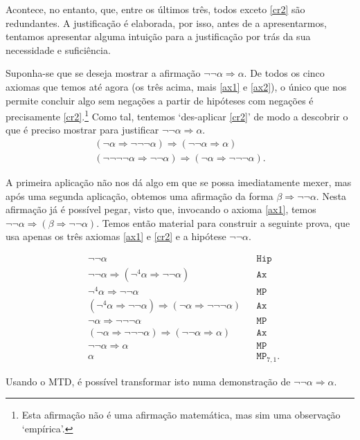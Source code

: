 \documentclass{report}
\theoremstyle{definition}
\theoremstyle{remark}
\newcommand{\imply}{\mathbin{\Rightarrow}}
\begin{document}
	Acontece, no entanto, que, entre os últimos três, todos exceto \eqref{cr2} são redundantes. A justificação é elaborada, por isso, antes de a apresentarmos, tentamos apresentar alguma intuição para a justificação por trás da sua necessidade e suficiência.
	
	Suponha-se que se deseja mostrar a afirmação $\neg \neg \alpha \imply \alpha$. De todos os cinco axiomas que temos até agora (os três acima, mais \eqref{ax1} e \eqref{ax2}), o único que nos permite concluir algo sem negações a partir de hipóteses com negações é precisamente \eqref{cr2}.\footnote{Esta afirmação não é uma afirmação matemática, mas sim uma observação `empírica'.} Como tal, tentemos `des-aplicar \eqref{cr2}' de modo a descobrir o que é preciso mostrar para justificar $\neg\neg\alpha \imply \alpha$.
	\begin{gather*}
	(\neg\alpha \imply \neg\neg\neg\alpha) \imply (\neg\neg\alpha \imply \alpha)\\
	(\neg\neg\neg\neg\alpha \imply \neg\neg\alpha) \imply (\neg\alpha \imply \neg\neg\neg\alpha).
	\end{gather*}
	
	A primeira aplicação não nos dá algo em que se possa imediatamente mexer, mas após uma segunda aplicação, obtemos uma afirmação da forma $\beta \imply \neg\neg\alpha$. Nesta afirmação já é possível pegar, visto que, invocando o axioma \eqref{ax1}, temos $\neg\neg\alpha \imply (\beta \imply \neg\neg\alpha)$. Temos então material para construir a seguinte prova, que usa apenas os três axiomas \eqref{ax1} e \eqref{cr2} e a hipótese $\neg\neg\alpha$.
	
	\begin{align*}
	&\neg\neg\alpha&&\texttt{Hip}\\
	&\neg\neg\alpha \imply (\neg^4 \alpha \imply \neg\neg\alpha)&&\texttt{Ax}\\
	&\neg^4 \alpha \imply \neg\neg\alpha&&\texttt{MP}\\
	&(\neg^4 \alpha \imply \neg\neg\alpha) \imply (\neg\alpha \imply \neg\neg\neg\alpha)&&\texttt{Ax}\\
	&\neg\alpha \imply \neg\neg\neg\alpha&&\texttt{MP}\\
	&(\neg\alpha \imply \neg\neg\neg\alpha)\imply(\neg\neg\alpha \imply \alpha)&&\texttt{Ax}\\
	&\neg\neg\alpha \imply \alpha&&\texttt{MP}\\
	&\alpha&&\texttt{MP}_{7,1}.
	\end{align*}
	
	Usando o MTD, é possível transformar isto numa demonstração de $\neg\neg\alpha \imply \alpha$.
	
\end{document}

